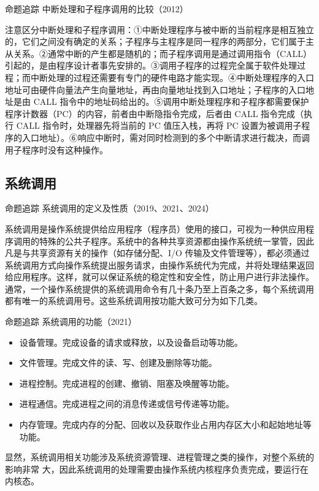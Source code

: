 \documentclass{ctexbook}
\begin{document}
	\colorbox{gray!20}{命题追踪 \enspace 中断处理和子程序调用的比较（2012）}
	
	注意区分中断处理和子程序调用：①中断处理程序与被中断的当前程序是相互独立的，它们之间没有确定的关系；子程序与主程序是同一程序的两部分，它们属于主从关系。②通常中断的产生都是随机的；而子程序调用是通过调用指令（CALL）引起的，是由程序设计者事先安排的。③调用子程序的过程完全属于软件处理过程；而中断处理的过程还需要有专门的硬件电路才能实现。④中断处理程序的入口地址可由硬件向量法产生向量地址，再由向量地址找到入口地址；子程序的入口地址是由 CALL 指令中的地址码给出的。⑤调用中断处理程序和子程序都需要保护程序计数器（PC）的内容，前者由中断隐指令完成，后者由 CALL 指令完成（执行 CALL 指令时，处理器先将当前的 PC 值压入栈，再将 PC 设置为被调用子程序的入口地址）。⑥响应中断时，需对同时检测到的多个中断请求进行裁决，而调用子程序时没有这种操作。
	
	\subsection{系统调用}
	\colorbox{gray!20}{命题追踪 \enspace 系统调用的定义及性质（2019、2021、2024）}
	
	系统调用是操作系统提供给应用程序（程序员）使用的接口，可视为一种供应用程序调用的特殊的公共子程序。系统中的各种共享资源都由操作系统统一掌管，因此凡是与共享资源有关的操作（如存储分配、I/O 传输及文件管理等），都必须通过系统调用方式向操作系统提出服务请求，由操作系统代为完成，并将处理结果返回给应用程序。这样，就可以保证系统的稳定性和安全性，防止用户进行非法操作。通常，一个操作系统提供的系统调用命令有几十条乃至上百条之多，每个系统调用都有唯一的系统调用号。这些系统调用按功能大致可分为如下几类。
	
	\colorbox{gray!20}{命题追踪 \enspace 系统调用的功能（2021）}
	\begin{itemize}
		\item 设备管理。完成设备的请求或释放，以及设备启动等功能。
		\item 文件管理。完成文件的读、写、创建及删除等功能。
		\item 进程控制。完成进程的创建、撤销、阻塞及唤醒等功能。
		\item 进程通信。完成进程之间的消息传递或信号传递等功能。
		\item 内存管理。完成内存的分配、回收以及获取作业占用内存区大小和起始地址等功能。
	\end{itemize}
	显然，系统调用相关功能涉及系统资源管理、进程管理之类的操作，对整个系统的影响非常
	大，因此系统调用的处理需要由操作系统内核程序负责完成，要运行在内核态。
	
\end{document}
